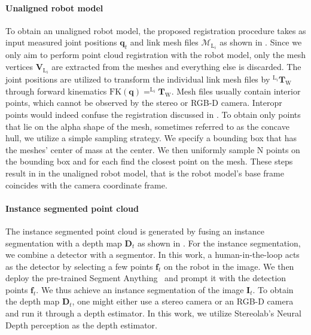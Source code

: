 \paragraph{Unaligned robot model}
\label{c1:sec:unaligned_robot_model}
To obtain an unaligned robot model, the proposed registration procedure takes as input measured joint positions $\mathbf{q}_t$ and link mesh files $\mathcal{M}_{\text{L}_i}$ as shown in . Since we only aim to perform point cloud registration with the robot model, only the mesh vertices $\mathbf{V}_{\text{L}_i}$ are extracted from the meshes and everything else is discarded. The joint positions are utilized to transform the individual link mesh files by $^{\text{L}_i}\mathbf{T}_\text{W}$ through forward kinematics $\text{FK}(\mathbf{q}) = ^{\text{L}_i}\mathbf{T}_\text{W}$. Mesh files usually contain interior points, which cannot be observed by the stereo or RGB-D camera.
Interopr points would indeed confuse the registration discussed in . To obtain only points that lie on the alpha shape of the mesh, sometimes referred to as the concave hull, we utilize a simple sampling strategy. We specify a bounding box that has the meshes' center of mass at the center. We then uniformly sample N points on the bounding box and for each find the closest point on the mesh. These steps result in in the unaligned robot model, that is the robot model's base frame coincides with the camera coordinate frame.

\paragraph{Instance segmented point cloud}
\label{c1:sec:instance_segmented_point_cloud}
The instance segmented point cloud is generated by fusing an instance segmentation with a depth map $\mathbf{D}_t$ as shown in . For the instance segmentation, we combine a detector with a segmentor. In this work, a human-in-the-loop acts as the detector by selecting a few points $\mathbf{f}_t$ on the robot in the image. We then deploy the pre-trained Segment Anything~\cite{segment_anything} and prompt it with the detection points $\mathbf{f}_t$. We thus achieve an instance segmentation of the image $\mathbf{I}_t$. To obtain the depth map $\mathbf{D}_t$, one might either use a stereo camera or an RGB-D camera and run it through a depth estimator. In this work, we utilize Stereolab's Neural Depth perception as the depth estimator.

